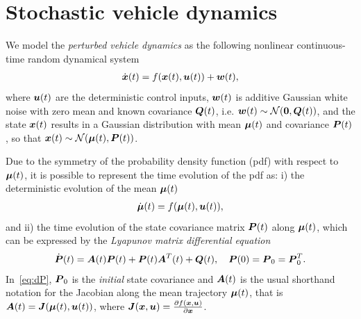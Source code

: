 \section{Stochastic vehicle dynamics}
\label{sec:stochastic_vehicle_dynamics}

We model the \emph{perturbed vehicle dynamics} as the following nonlinear continuous-time random dynamical system
\begin{align}
\dot{\boldsymbol{x}}(t) = f(\boldsymbol{x}(t), \boldsymbol{u}(t)) + \boldsymbol{w}(t),
\end{align}
where $\boldsymbol{u}(t)$ are the deterministic control inputs, $\boldsymbol{w}(t)$ is additive Gaussian white noise with zero mean and known covariance $\boldsymbol{Q}(t)$, i.e. $\boldsymbol{w}(t) \sim \mathcal{N}(\boldsymbol{0}, \boldsymbol{Q}(t))$, and the state $\boldsymbol{x}(t)$ results in a Gaussian distribution with mean $\boldsymbol{\mu}(t)$ and covariance $\boldsymbol{P}(t)$, so that $\boldsymbol{x}(t) \sim \mathcal{N}(\boldsymbol{\mu}(t), \boldsymbol{P}(t))$.

Due to the symmetry of the probability density function (pdf) with respect to $\boldsymbol{\mu}(t)$, it is possible to represent the time evolution of the pdf as: i) the deterministic evolution of the mean $\boldsymbol{\mu}(t)$
\begin{align}\label{eq:meandynamics}
\dbmu(t) = f(\bmu(t), \bu(t)),
\end{align}
and ii) the time evolution of the state covariance matrix $\boldsymbol{P}(t)$ along $\boldsymbol{\mu}(t)$, which can be expressed by the \emph{Lyapunov matrix differential equation}
\begin{align}\label{eq:dP}
\dbP(t) = \bA(t) \bP(t) + \bP(t) \bA^T(t) + \bQ(t),\quad \bP(0) = \bP_0 = \bP_0^T.
\end{align}
In~\eqref{eq:dP}, $\boldsymbol{P}_0$ is the \emph{initial} state covariance and $\boldsymbol{A}(t)$ is the usual shorthand notation for the Jacobian along the mean trajectory $\boldsymbol{\mu}(t)$, that is $\boldsymbol{A}(t)=\boldsymbol{J}(\boldsymbol{\mu}(t),\boldsymbol{u}(t))$, where $\boldsymbol{J}(\boldsymbol{x}, \boldsymbol{u}) = \frac{\partial f(\boldsymbol{x}, \boldsymbol{u})}{\partial \boldsymbol{x}}$.

